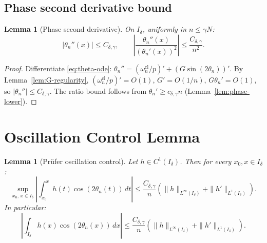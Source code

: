 \documentclass[12pt,a4paper]{amsart}
\newtheorem{lemma}[theorem]{Lemma}
\newcommand{\wncl}{\omega_n^{\mathrm{cl}}}
\begin{document}
\subsection{Phase second derivative bound}

\begin{lemma}[Phase second derivative]%
\label{lem:phase-second-deriv}
On $I_\delta$, uniformly in $n \le \gamma N$:
\begin{equation}\label{eq:phase-2nd}
  |\theta_n''(x)| \le C_{\delta,\gamma},
  \qquad
  \left|\frac{\theta_n''(x)}{(\theta_n'(x))^2}\right|
  \le \frac{C_{\delta,\gamma}}{n^2}.
\end{equation}
\end{lemma}

\begin{proof}
Differentiate \eqref{eq:theta-ode}:
$\theta_n'' = (\wncl/p)' + (G\sin(2\theta_n))'$.
By Lemma~\ref{lem:G-regularity},
$(\wncl/p)' = O(1)$, $G' = O(1/n)$,
$G\theta_n' = O(1)$, so $|\theta_n''| \le C_{\delta,\gamma}$.
The ratio bound follows from
$\theta_n' \ge c_{\delta,\gamma}n$
(Lemma~\ref{lem:phase-lower}).
\end{proof}

\section{Oscillation Control Lemma}\label{sec:oscillation}

\begin{lemma}[Pr\"ufer oscillation control]%
\label{lem:prufer-oscillation-control}
Let $h \in C^1(I_\delta)$. Then for every
$x_0, x \in I_\delta$:
\begin{equation}\label{eq:osc-control-sup}
  \sup_{x_0,\,x \in I_\delta}
  \left|\int_{x_0}^{x} h(t)\cos(2\theta_n(t))\,dt\right|
  \le \frac{C_{\delta,\gamma}}{n}
      \left(\|h\|_{L^\infty(I_\delta)}
        + \|h'\|_{L^1(I_\delta)}\right).
\end{equation}
In particular:
\begin{equation}\label{eq:osc-control}
  \left|\int_{I_\delta} h(x)\cos(2\theta_n(x))\,dx\right|
  \le \frac{C_{\delta,\gamma}}{n}
      \left(\|h\|_{L^\infty(I_\delta)}
        + \|h'\|_{L^1(I_\delta)}\right).
\end{equation}
\end{lemma}
\end{document}
